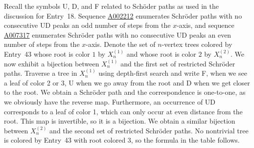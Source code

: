 \documentclass[12pt]{amsart}
\newcommand{\seqnum}[1]{\href{https://oeis.org/#1}{#1}}
\begin{document}
\begin{description}
\begin{itemize}
\end{itemize}
    \item[Discussion] Recall the symbols U, D, and F related to Sch\"oder paths as used in the discussion for Entry~18. Sequence \seqnum{A002212} enumerates Schr\"{o}der paths with no consecutive UD peaks an odd number of steps from the $x$-axis, and sequence \seqnum{A007317} enumerates Schr\"oder paths with no consecutive UD peaks an even number of steps from the $x$-axis. Denote the set of $n$-vertex trees colored by Entry~43 whose root is color $1$ by $X^{(1)}_n$ and whose root is color $2$ by $X^{(2)}_n$. We now exhibit a bijection between $X^{(1)}_n$ and the first set of restricted Schr\"oder paths. Traverse a tree in $X^{(1)}_n$ using depth-first search and write F, when we see a leaf of color 2 or 3, U when we go away from the root and D when we get closer to the root. We obtain a Schr\"{o}der path and the correspondence is one-to-one, as we obviously have the reverse map. Furthermore, an occurrence of UD corresponds to a leaf of color 1, which can only occur at even distance from the root. This map is invertible, so it is a bijection. We obtain a similar bijection between $X^{(2)}_n$ and the second set of restricted Schr\"oder paths. No nontrivial tree is colored by Entry~43 with root colored 3, so the formula in the table follows.
\end{description}
\end{document}

